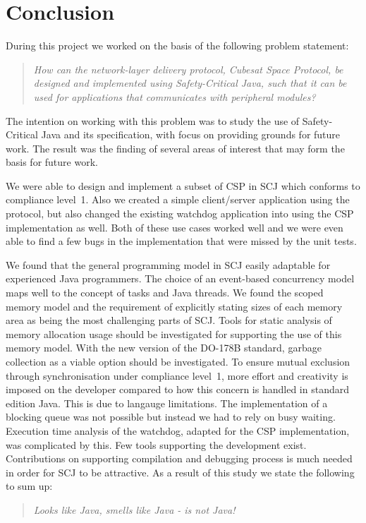 \chapter{Conclusion}
\label{chapter:Conclusion}
During this project we worked on the basis of the following problem statement:
\begin{quotation}
	\textit{How can the network-layer delivery protocol, Cubesat Space Protocol, be designed and implemented using Safety-Critical Java, such that it can be used for applications that communicates with peripheral modules?}
\end{quotation}
The intention on working with this problem was to study the use of Safety-Critical Java and its specification, with focus on providing grounds for future work. The result was the finding of several areas of interest that may form the basis for future work.

We were able to design and implement a subset of CSP in SCJ which conforms to compliance level~1. Also we created a simple client/server application using the protocol, but also changed the existing watchdog application into using the CSP implementation as well. Both of these use cases worked well and we were even able to find a few bugs in the implementation that were missed by the unit tests.

We found that the general programming model in SCJ easily adaptable for experienced Java programmers. The choice of an event-based concurrency model maps well to the concept of tasks and Java threads. We found the scoped memory model and the requirement of explicitly stating sizes of each memory area as being the most challenging parts of SCJ. Tools for static analysis of memory allocation usage should be investigated for supporting the use of this memory model. With the new version of the DO-178B standard, garbage collection as a viable option should be investigated. To ensure mutual exclusion through synchronisation under compliance level~1, more effort and creativity is imposed on the developer compared to how this concern is handled in standard edition Java. This is due to langauge limitations. The implementation of a blocking queue was not possible but instead we had to rely on busy waiting. Execution time analysis of the watchdog, adapted for the CSP implementation, was complicated by this. Few tools supporting the development exist. Contributions on supporting compilation and debugging process is much needed in order for SCJ to be attractive. As a result of this study we state the following to sum up: 
\begin{quotation}
\centering
	\textit{Looks like Java, smells like Java - is not Java!}
\end{quotation}